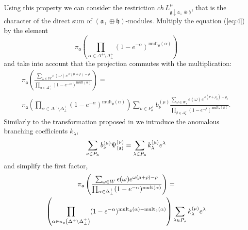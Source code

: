 \documentclass[a4paper,12pt]{article}
\theoremstyle{definition} \newtheorem{Def}{Definition}
\begin{document}
Using this property we can consider the restriction $ch\, L^{\mu}_{\mathfrak{g}\downarrow \mathfrak{a}_{\bot}\oplus \mathfrak{h}}$, that is the character of the direct sum of $\left( \mathfrak{a}_{\bot}\oplus\mathfrak{h}\right) $-modules.
Multiply the equation (\ref{eq:4}) by the element
\begin{equation}
  \label{eq:5}
  \pi_{\mathfrak{a}}\left(\prod_{\alpha\in \Delta^{+}\setminus \Delta^{+}_{\bot}}(1-e^{-\alpha})^{\mathrm{mult}_{\mathfrak{g}}(\alpha)} \right)
\end{equation}
and take into account that the projection commutes with the multiplication:
\begin{multline}
  \label{eq:7}
  \pi_{\mathfrak{a}}\left(\frac{\sum_{\omega\in W} \epsilon(\omega) e^{\omega(\mu+\rho)-\rho}}{\prod_{\alpha\in\Delta^{+}_{\bot}}(1-e^{-\alpha})^{\mathrm{mult}(\alpha)}}\right) = \\
  \pi_{\mathfrak{a}}\left(\prod_{\alpha\in \Delta^{+}\setminus \Delta^{+}_{\bot}}(1-e^{-\alpha})^{\mathrm{mult}_{\mathfrak{g}}(\alpha)} \right)\sum_{\nu\in P^{+}_{\mathfrak{a}}}b^{(\mu)}_{\nu}
  \frac{\sum_{\omega\in W_{\mathfrak{a}}}\epsilon(\omega)e^{\omega(\nu+\rho_{\mathfrak{a}})-\rho_{\mathfrak{a}}}}{\prod_{\beta\in \Delta_{\mathfrak{a}}^{+}}(1-e^{-\beta})^{\mathrm{mult}_{\mathfrak{a}}(\beta)}}.
\end{multline}
Similarly to the transformation proposed in \cite{ilyin812pbc} we introduce the anomalous branching coefficients $k_{\lambda}$,
\begin{equation}
  \label{eq:10}
  \sum_{\nu \in P_{\frak{a}}}b_{\nu }^{\left( \mu \right) }\Psi _{\left( \frak{%
        a}\right) }^{\left( \nu \right) }=\sum_{\lambda \in P_{\frak{a}}}k_{\lambda
  }^{\left( \mu \right) }e^{\lambda }
\end{equation}
and simplify the first factor,
\begin{multline}
  \label{eq:12}
  \pi_{\mathfrak{a}}\left(\frac{\sum_{\omega\in W} \epsilon(\omega) e^{\omega(\mu+\rho)-\rho}}{\prod_{\alpha\in\Delta^{+}_{\bot}}(1-e^{-\alpha})^{\mathrm{mult}(\alpha)}}\right) = \\
  \left(\prod_{\alpha\in \pi_{\mathfrak{a}}\left(\Delta^{+}\setminus \Delta^{+}_{\bot}\right)}(1-e^{-\alpha})^{{\rm mult}_{\mathfrak{g}}(\alpha)-{\rm mult}_{\mathfrak{a}}(\alpha)} \right)
    \sum_{\lambda \in P_{\frak{a}}}k_{\lambda}^{\left( \mu \right) }e^{\lambda }
\end{multline}
\end{document}

